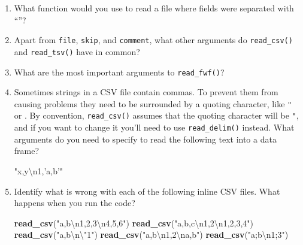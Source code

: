 \documentclass[]{book}
\newenvironment{Shaded}{\begin{snugshade}}{\end{snugshade}}
\newcommand{\KeywordTok}[1]{\textcolor[rgb]{0.13,0.29,0.53}{\textbf{{#1}}}}
\newcommand{\CharTok}[1]{\textcolor[rgb]{0.31,0.60,0.02}{{#1}}}
\newcommand{\StringTok}[1]{\textcolor[rgb]{0.31,0.60,0.02}{{#1}}}
\newcommand{\NormalTok}[1]{{#1}}
\begin{document}
\begin{enumerate}
\def\labelenumi{\arabic{enumi}.}
\item
  What function would you use to read a file where fields were separated
  with\\
  ``\textbar{}''?
\item
  Apart from \texttt{file}, \texttt{skip}, and \texttt{comment}, what
  other arguments do \texttt{read\_csv()} and \texttt{read\_tsv()} have
  in common?
\item
  What are the most important arguments to \texttt{read\_fwf()}?
\item
  Sometimes strings in a CSV file contain commas. To prevent them from
  causing problems they need to be surrounded by a quoting character,
  like \texttt{"} or \texttt{\textquotesingle{}}. By convention,
  \texttt{read\_csv()} assumes that the quoting character will be
  \texttt{"}, and if you want to change it you'll need to use
  \texttt{read\_delim()} instead. What arguments do you need to specify
  to read the following text into a data frame?

\begin{Shaded}
\begin{Highlighting}[]
\StringTok{"x,y}\CharTok{\textbackslash{}n}\StringTok{1,'a,b'"}
\end{Highlighting}
\end{Shaded}
\item
  Identify what is wrong with each of the following inline CSV files.
  What happens when you run the code?

\begin{Shaded}
\begin{Highlighting}[]
\KeywordTok{read_csv}\NormalTok{(}\StringTok{"a,b}\CharTok{\textbackslash{}n}\StringTok{1,2,3}\CharTok{\textbackslash{}n}\StringTok{4,5,6"}\NormalTok{)}
\KeywordTok{read_csv}\NormalTok{(}\StringTok{"a,b,c}\CharTok{\textbackslash{}n}\StringTok{1,2}\CharTok{\textbackslash{}n}\StringTok{1,2,3,4"}\NormalTok{)}
\KeywordTok{read_csv}\NormalTok{(}\StringTok{"a,b}\CharTok{\textbackslash{}n\textbackslash{}"}\StringTok{1"}\NormalTok{)}
\KeywordTok{read_csv}\NormalTok{(}\StringTok{"a,b}\CharTok{\textbackslash{}n}\StringTok{1,2}\CharTok{\textbackslash{}n}\StringTok{a,b"}\NormalTok{)}
\KeywordTok{read_csv}\NormalTok{(}\StringTok{"a;b}\CharTok{\textbackslash{}n}\StringTok{1;3"}\NormalTok{)}
\end{Highlighting}
\end{Shaded}
\end{enumerate}
\end{document}
